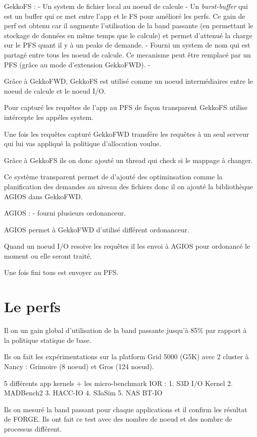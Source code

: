\documentclass[10pt, a4paper]{article}
\begin{document}
GekkoFS :
- Un system de fichier local au noeud de calcule
- Un \emph{burst-buffer} qui est un buffer qui ce met entre l'app et le FS pour amélioré les perfs. Ce gain de perf est obtenu car il augmente l'utilisation de la band passante (en permettant le stockage de données en même temps que le calcule) et permet d'attenué la charge sur le PFS quant il y à un peaks de demande.
- Fourni un system de nom qui est partagé entre tous les noeud de calcule. Ce mecanisme peut être remplacé par un PFS (grâce au mode d'extension GekkoFWD).
- 

Grâce à GekkoFWD, GekkoFS est utilisé comme un noeud intermédiaires entre le noeud de calcule et le noeud I/O.

Pour capturé les requêtes de l'app au PFS de façon transparent GekkoFS utilise intércepte les appéles system.

Une fois les requêtes capturé GekkoFWD transfére les requêtes à un seul serveur qui lui vas appliqué la politique d'allocation voulue.

Grâce à GekkoFS ils on donc ajouté un thread qui check si le mappage à changer.

Ce système transparent permet de d'ajouté des optiminsation comme la planification des demandes au niveau des fichiers donc il on ajouté la bibliothèque AGIOS dans GekkoFWD.

AGIOS :
- fourni plusieurs ordonanceur.

AGIOS permet à GekkoFWD d'utilisé différent ordonanceur.

Quand un noeud I/O resoive les requêtes il les envoi à AGIOS pour ordonancé le moment ou elle seront traité.

Une fois fini tous est envoyer au PFS.

\section{Le perfs}

Il on un gain global d'utilisation de la band passante jusqu'à 85\% par rapport à la politique statique de base.


Ils on fait les expérimentations sur la platform Grid 5000 (G5K) avec 2 cluster à Nancy : Grimoire (8 noeud) et Gros (124 noeud). %

5 différents app kernels + les micro-benchmark IOR :
1. S3D I/O Kernel
2. MADBench2
3. HACC-IO
4. S3aSim
5. NAS BT-IO

Ils on mesuré la band passant pour chaque applications et il confirm les résultat de FORGE. Ils ont fait ce test avec des nombre de noeud et des nombre de processus différent.
\end{document}
